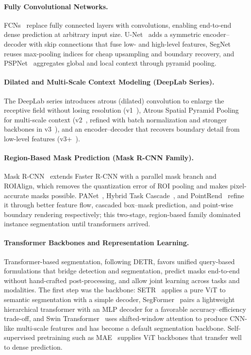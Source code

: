 \paragraph{Fully Convolutional Networks.}
FCNs~\cite{long2015fcn} replace fully connected layers with convolutions, enabling end-to-end dense prediction at arbitrary input size. U-Net~\cite{ronneberger2015unet} adds a symmetric encoder--decoder with skip connections that fuse low- and high-level features, SegNet~\cite{badrinarayanan2017segnet} reuses max-pooling indices for cheap upsampling and boundary recovery, and PSPNet~\cite{zhao2017pspnet} aggregates global and local context through pyramid pooling.

\paragraph{Dilated and Multi-Scale Context Modeling (DeepLab Series).}
The DeepLab series introduces atrous (dilated) convolution to enlarge the receptive field without losing resolution (v1~\cite{chen2015deeplab}), Atrous Spatial Pyramid Pooling for multi-scale context (v2~\cite{chen2017deeplabv2}, refined with batch normalization and stronger backbones in v3~\cite{chen2017deeplabv3}), and an encoder--decoder that recovers boundary detail from low-level features (v3+~\cite{chen2018deeplabv3plus}).

\paragraph{Region-Based Mask Prediction (Mask R-CNN Family).}
Mask R-CNN~\cite{he2017mask} extends Faster R-CNN with a parallel mask branch and ROIAlign, which removes the quantization error of ROI pooling and makes pixel-accurate masks possible. PANet~\cite{liu2018panet}, Hybrid Task Cascade~\cite{chen2019htc}, and PointRend~\cite{kirillov2020pointrend} refine it through better feature flow, cascaded box--mask prediction, and point-wise boundary rendering respectively; this two-stage, region-based family dominated instance segmentation until transformers arrived.



\paragraph{Transformer Backbones and Representation Learning.}
Transformer-based segmentation, following DETR, favors unified query-based formulations that bridge detection and segmentation, predict masks end-to-end without hand-crafted post-processing, and allow joint learning across tasks and modalities. The first step was the backbone: SETR~\cite{zheng2021setr} applies a pure ViT to semantic segmentation with a simple decoder, SegFormer~\cite{xie2021segformer} pairs a lightweight hierarchical transformer with an MLP decoder for a favorable accuracy--efficiency trade-off, and Swin Transformer~\cite{liu2021swin} uses shifted-window attention to produce CNN-like multi-scale features and has become a default segmentation backbone. Self-supervised pretraining such as MAE~\cite{he2022masked} supplies ViT backbones that transfer well to dense prediction.


